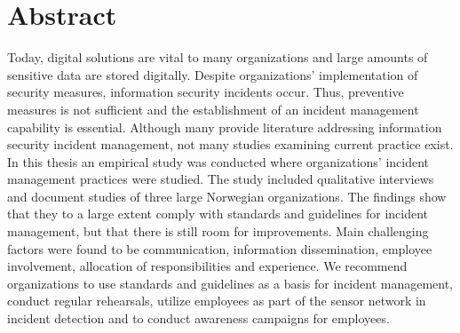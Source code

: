 \chapter*{Abstract}
Today, digital solutions are vital to many organizations and large amounts of sensitive data are stored digitally. Despite organizations' implementation of security measures, information security incidents occur. Thus, preventive measures is not sufficient and the establishment of an incident management capability is essential. Although many provide literature addressing information security incident management, not many studies examining current practice exist. In this thesis an empirical study was conducted where organizations' incident management practices were studied. The study included qualitative interviews and document studies of three large Norwegian organizations. The findings show that they to a large extent comply with standards and guidelines for incident management, but that there is still room for improvements. Main challenging factors were found to be communication, information dissemination, employee involvement, allocation of responsibilities and experience. We recommend organizations to use standards and guidelines as a basis for incident management, conduct regular rehearsals, utilize employees as part of the sensor network in incident detection and to conduct awareness campaigns for employees.